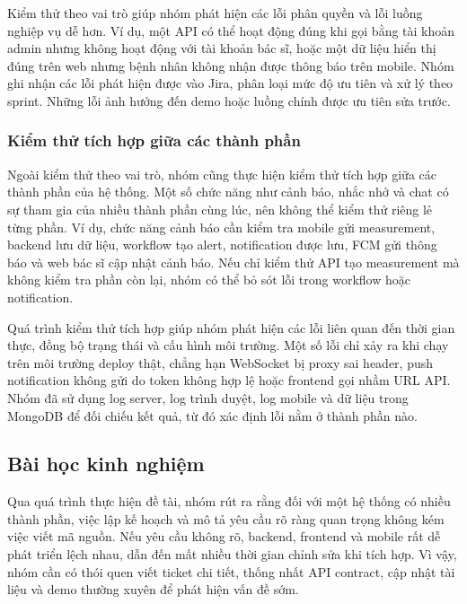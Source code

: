 \par Kiểm thử theo vai trò giúp nhóm phát hiện các lỗi phân quyền và lỗi luồng nghiệp vụ dễ hơn. Ví dụ, một API có thể hoạt động đúng khi gọi bằng tài khoản admin nhưng không hoạt động với tài khoản bác sĩ, hoặc một dữ liệu hiển thị đúng trên web nhưng bệnh nhân không nhận được thông báo trên mobile. Nhóm ghi nhận các lỗi phát hiện được vào Jira, phân loại mức độ ưu tiên và xử lý theo sprint. Những lỗi ảnh hưởng đến demo hoặc luồng chính được ưu tiên sửa trước.

\subsubsection{Kiểm thử tích hợp giữa các thành phần}
\par Ngoài kiểm thử theo vai trò, nhóm cũng thực hiện kiểm thử tích hợp giữa các thành phần của hệ thống. Một số chức năng như cảnh báo, nhắc nhở và chat có sự tham gia của nhiều thành phần cùng lúc, nên không thể kiểm thử riêng lẻ từng phần. Ví dụ, chức năng cảnh báo cần kiểm tra mobile gửi measurement, backend lưu dữ liệu, workflow tạo alert, notification được lưu, FCM gửi thông báo và web bác sĩ cập nhật cảnh báo. Nếu chỉ kiểm thử API tạo measurement mà không kiểm tra phần còn lại, nhóm có thể bỏ sót lỗi trong workflow hoặc notification.

\par Quá trình kiểm thử tích hợp giúp nhóm phát hiện các lỗi liên quan đến thời gian thực, đồng bộ trạng thái và cấu hình môi trường. Một số lỗi chỉ xảy ra khi chạy trên môi trường deploy thật, chẳng hạn WebSocket bị proxy sai header, push notification không gửi do token không hợp lệ hoặc frontend gọi nhầm URL API. Nhóm đã sử dụng log server, log trình duyệt, log mobile và dữ liệu trong MongoDB để đối chiếu kết quả, từ đó xác định lỗi nằm ở thành phần nào.

\subsection{Bài học kinh nghiệm}
\par Qua quá trình thực hiện đề tài, nhóm rút ra rằng đối với một hệ thống có nhiều thành phần, việc lập kế hoạch và mô tả yêu cầu rõ ràng quan trọng không kém việc viết mã nguồn. Nếu yêu cầu không rõ, backend, frontend và mobile rất dễ phát triển lệch nhau, dẫn đến mất nhiều thời gian chỉnh sửa khi tích hợp. Vì vậy, nhóm cần có thói quen viết ticket chi tiết, thống nhất API contract, cập nhật tài liệu và demo thường xuyên để phát hiện vấn đề sớm.

